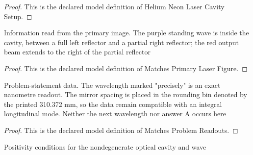 \begin{proof}
  This is the declared model definition of Helium Neon Laser Cavity Setup.
\end{proof}
\begin{definition}
  \label{def:physics:phyx-mini-0245:phyxminiproblems-problemphyxmini0245-matchesprimarylaserfigure}
  Information read from the primary image. The purple standing wave is inside the cavity, between a full left reflector and a partial right reflector; the red output beam extends to the right of the partial reflector
\end{definition}
\begin{proof}
  This is the declared model definition of Matches Primary Laser Figure.
\end{proof}
\begin{definition}
  \label{def:physics:phyx-mini-0245:phyxminiproblems-problemphyxmini0245-matchesproblemreadouts}
  Problem-statement data. The wavelength marked "precisely" is an exact nanometre readout. The mirror spacing is placed in the rounding bin denoted by the printed 310.372 mm, so the data remain compatible with an integral longitudinal mode. Neither the next wavelength nor answer A occurs here
\end{definition}
\begin{proof}
  This is the declared model definition of Matches Problem Readouts.
\end{proof}
\begin{definition}
  \label{def:physics:phyx-mini-0245:phyxminiproblems-problemphyxmini0245-hasphysicallaserparameters}
  Positivity conditions for the nondegenerate optical cavity and wave
\end{definition}
